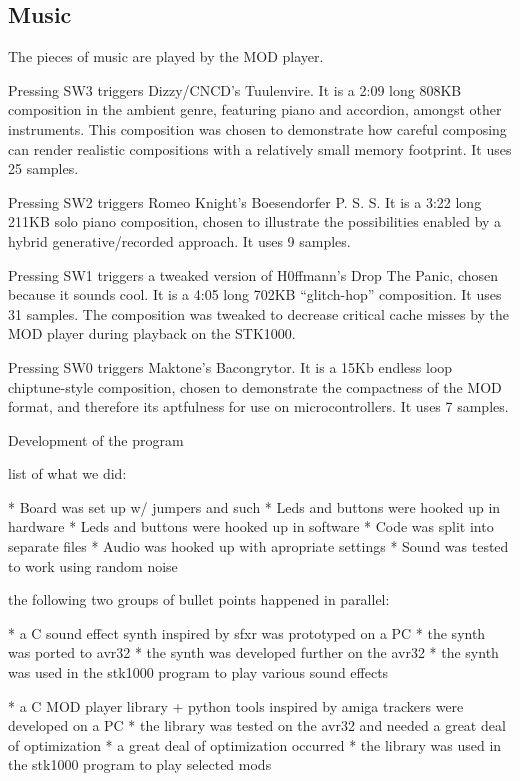 \subsection{Music}

The pieces of music are played by the MOD player.

Pressing SW3 triggers Dizzy/CNCD's Tuulenvire.
It is a 2:09 long 808KB composition in the ambient genre, featuring piano and accordion, amongst other instruments.
This composition was chosen to demonstrate how careful composing can render realistic compositions with a relatively small memory footprint.
It uses 25 samples.

Pressing SW2 triggers Romeo Knight's Boesendorfer P. S. S.
It is a 3:22 long 211KB solo piano composition, chosen to illustrate the possibilities enabled by a hybrid generative/recorded approach.
It uses 9 samples.

Pressing SW1 triggers a tweaked version of H0ffmann's Drop The Panic, chosen because it sounds cool.
It is a 4:05 long 702KB ``glitch-hop'' composition.
It uses 31 samples.
The composition was tweaked to decrease critical cache misses by the MOD player during playback on the STK1000.

Pressing SW0 triggers Maktone's Bacongrytor.
It is a 15Kb endless loop chiptune-style composition, chosen to demonstrate the compactness of the MOD format, and therefore its aptfulness for use on microcontrollers.
It uses 7 samples.


Development of the program

list of what we did:

* Board was set up w/ jumpers and such
* Leds and buttons were hooked up in hardware
* Leds and buttons were hooked up in software
* Code was split into separate files
* Audio was hooked up with apropriate settings
* Sound was tested to work using random noise


the following two groups of bullet points happened in parallel:

* a C sound effect synth inspired by sfxr was prototyped on a PC
* the synth was ported to avr32
* the synth was developed further on the avr32
* the synth was used in the stk1000 program to play various sound effects

* a C MOD player library + python tools inspired by amiga trackers were developed on a PC
* the library was tested on the avr32 and needed a great deal of optimization
* a great deal of optimization occurred 
* the library was used in the stk1000 program to play selected mods


